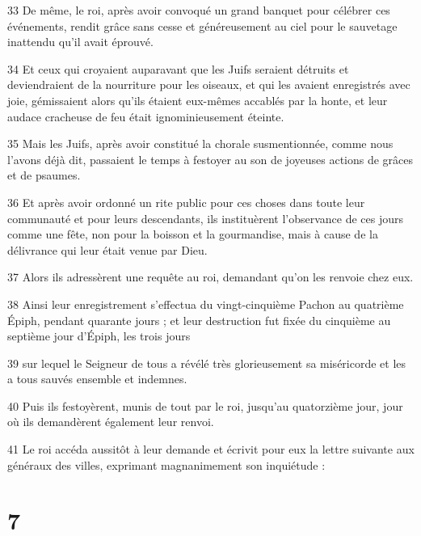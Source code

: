 \par 33 De même, le roi, après avoir convoqué un grand banquet pour célébrer ces événements, rendit grâce sans cesse et généreusement au ciel pour le sauvetage inattendu qu'il avait éprouvé.
\par 34 Et ceux qui croyaient auparavant que les Juifs seraient détruits et deviendraient de la nourriture pour les oiseaux, et qui les avaient enregistrés avec joie, gémissaient alors qu'ils étaient eux-mêmes accablés par la honte, et leur audace cracheuse de feu était ignominieusement éteinte.
\par 35 Mais les Juifs, après avoir constitué la chorale susmentionnée, comme nous l'avons déjà dit, passaient le temps à festoyer au son de joyeuses actions de grâces et de psaumes.
\par 36 Et après avoir ordonné un rite public pour ces choses dans toute leur communauté et pour leurs descendants, ils instituèrent l'observance de ces jours comme une fête, non pour la boisson et la gourmandise, mais à cause de la délivrance qui leur était venue par Dieu.
\par 37 Alors ils adressèrent une requête au roi, demandant qu'on les renvoie chez eux.
\par 38 Ainsi leur enregistrement s'effectua du vingt-cinquième Pachon au quatrième Épiph, pendant quarante jours ; et leur destruction fut fixée du cinquième au septième jour d'Épiph, les trois jours
\par 39 sur lequel le Seigneur de tous a révélé très glorieusement sa miséricorde et les a tous sauvés ensemble et indemnes.
\par 40 Puis ils festoyèrent, munis de tout par le roi, jusqu'au quatorzième jour, jour où ils demandèrent également leur renvoi.
\par 41 Le roi accéda aussitôt à leur demande et écrivit pour eux la lettre suivante aux généraux des villes, exprimant magnanimement son inquiétude :

\chapter{7}

